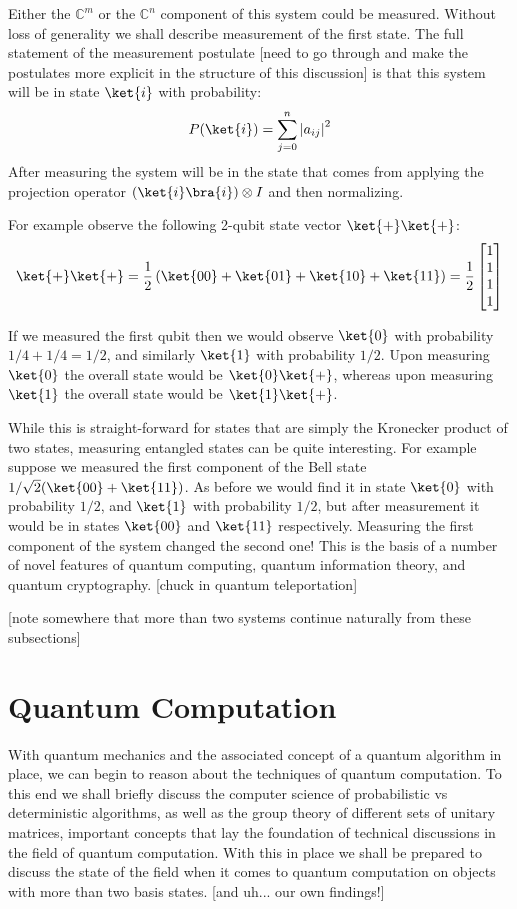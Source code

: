 Either the $\mathbb{C}^m$ or the $\mathbb{C}^n$ component of this system could be measured. Without loss of generality we shall describe measurement of the first state. The full statement of the measurement postulate [need to go through and make the postulates more explicit in the structure of this discussion] is that this system will be in state $\ket{i}$ with probability:
\[P(\ket{i}) = \sum_{j=0}^n\ord{a_{ij}}^2\]
After measuring the system will be in the state that comes from applying the projection operator $(\ket{i}\bra{i})\otimes I$ and then normalizing.

For example observe the following 2-qubit state vector $\ket{+}\ket{+}$:
\[\ket{+}\ket{+}=\frac{1}{2}\left(\ket{00}+\ket{01}+\ket{10}+\ket{11}\right)=\frac{1}{2}\left[\begin{matrix}
1\\
1\\
1\\
1
\end{matrix}\right]\]

If we measured the first qubit then we would observe $\ket{0}$ with probability $1/4+1/4 = 1/2$, and similarly $\ket{1}$ with probability $1/2$. Upon measuring $\ket{0}$ the overall state would be $\ket{0}\ket{+}$, whereas upon measuring $\ket{1}$ the overall state would be $\ket{1}\ket{+}$.

While this is straight-forward for states that are simply the Kronecker product of two states, measuring entangled states can be quite interesting. For example suppose we measured the first component of the Bell state $1/\sqrt{2}(\ket{00}+\ket{11})$. As before we would find it in state $\ket{0}$ with probability $1/2$, and $\ket{1}$ with probability $1/2$, but after measurement it would be in states $\ket{00}$ and $\ket{11}$ respectively. Measuring the first component of the system changed the second one! This is the basis of a number of novel features of quantum computing, quantum information theory, and quantum cryptography. [chuck in quantum teleportation]

[note somewhere that more than two systems continue naturally from these subsections]

\section{Quantum Computation}

With quantum mechanics and the associated concept of a quantum algorithm in place, we can begin to reason about the techniques of quantum computation. To this end we shall briefly discuss the computer science of probabilistic vs deterministic algorithms, as well as the group theory of different sets of unitary matrices, important concepts that lay the foundation of technical discussions in the field of quantum computation. With this in place we shall be prepared to discuss the state of the field when it comes to quantum computation on objects with more than two basis states. [and uh... our own findings!]

